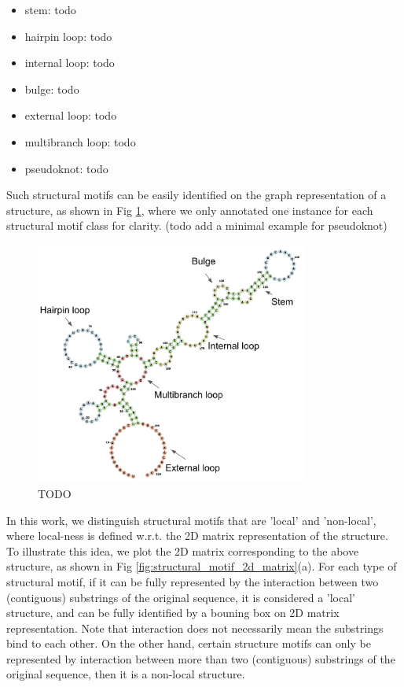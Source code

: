 \documentclass{article}
\begin{document}
\begin{itemize}
    \item stem: todo
    \item hairpin loop: todo
    \item internal loop: todo
    \item bulge: todo
    \item external loop: todo
    \item multibranch loop: todo
    \item pseudoknot: todo
\end{itemize}

Such structural motifs can be easily identified on the graph representation of a structure,
as shown in Fig \ref{fig:structural_motif_graph}, where we only annotated one instance for each structural motif class for clarity.
(todo add a minimal example for pseudoknot)

\begin{figure}[h]
    \centering
    \includegraphics[width=0.8\textwidth]{plot/structural_motif_graph.png}
    \caption{TODO}
    \label{fig:structural_motif_graph}
    \centering
\end{figure}


In this work, we distinguish structural motifs that are 'local' and 'non-local',
where local-ness is defined w.r.t. the 2D matrix representation of the structure.
To illustrate this idea, we plot the 2D matrix corresponding to the above structure,
as shown in Fig \ref{fig:structural_motif_2d_matrix}(a).
For each type of structural motif, if it can be fully represented by the interaction between
two (contiguous) substrings of the original sequence, it is considered a 'local' structure,
and can be fully identified by a bouning box on 2D matrix representation.
Note that interaction does not necessarily mean the substrings bind to each other.
On the other hand, certain structure motifs can only be represented by interaction between
more than two (contiguous) substrings of the original sequence, then it is a non-local structure.
\end{document}
